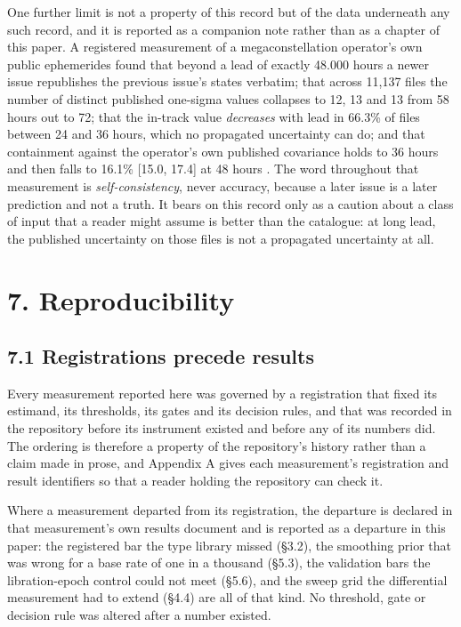 \documentclass[11pt]{article}
\begin{document}
One further limit is not a property of this record but of the data underneath any such record, and it is reported as a companion note rather than as a chapter of this paper. A registered measurement of a megaconstellation operator's own public ephemerides found that beyond a lead of exactly 48.000 hours a newer issue republishes the previous issue's states verbatim; that across 11,137 files the number of distinct published one-sigma values collapses to 12, 13 and 13 from 58 hours out to 72; that the in-track value \emph{decreases} with lead in 66.3\% of files between 24 and 36 hours, which no propagated uncertainty can do; and that containment against the operator's own published covariance holds to 36 hours and then falls to 16.1\% [15.0, 17.4] at 48 hours%
. The word throughout that measurement is \emph{self-consistency}, never accuracy, because a later issue is a later prediction and not a truth. It bears on this record only as a caution about a class of input that a reader might assume is better than the catalogue: at long lead, the published uncertainty on those files is not a propagated uncertainty at all.

\section*{7. Reproducibility}

\subsection*{7.1 Registrations precede results}

Every measurement reported here was governed by a registration that fixed its estimand, its thresholds, its gates and its decision rules, and that was recorded in the repository before its instrument existed and before any of its numbers did. The ordering is therefore a property of the repository's history rather than a claim made in prose, and Appendix A gives each measurement's registration and result identifiers so that a reader holding the repository can check it.

Where a measurement departed from its registration, the departure is declared in that measurement's own results document and is reported as a departure in this paper: the registered bar the type library missed (\S{}3.2), the smoothing prior that was wrong for a base rate of one in a thousand (\S{}5.3), the validation bars the libration-epoch control could not meet (\S{}5.6), and the sweep grid the differential measurement had to extend (\S{}4.4) are all of that kind. No threshold, gate or decision rule was altered after a number existed.
\end{document}
